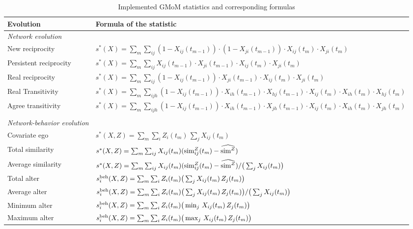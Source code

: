 \documentclass[a4paper,11pt]{article}
\begin{document}
\begin{table}%
\footnotesize
\begin{tabular}{ll}
\hline
Evolution & Formula of the statistic\\
\hline
\emph{Network evolution} & \\[2ex]
New reciprocity & $s^{*}(X)=\sum_{m}\sum_{ij}(1-X_{ij}(t_{m-1}))\cdot (1-X_{ji}(t_{m-1}))\cdot X_{ij}(t_{m})\cdot X_{ji}(t_{m})$\\[5ex]
Persistent reciprocity & $s^{*}(X)=\sum_{m}\sum_{ij}X_{ij}(t_{m-1})\cdot X_{ji}(t_{m-1})\cdot X_{ij}(t_{m})\cdot X_{ji}(t_{m})$\\[5ex]
Real reciprocity & $s^{*}(X)=\sum_{m}\sum_{ij}(1-X_{ij}(t_{m-1}))\cdot X_{ji}(t_{m-1})\cdot X_{ij}(t_{m})\cdot X_{ji}(t_{m}) $\\[5ex]
Real Transitivity & $s^{*}(X)=\sum_{m}\sum_{ijh}(1-X_{ij}(t_{m-1}))\cdot X_{ih}(t_{m-1})\cdot X_{hj}(t_{m-1})\cdot X_{ij}(t_{m})\cdot X_{ih}(t_{m})\cdot X_{hj}(t_{m})$\\[5ex]
Agree transitivity & $s^{*}(X)=\sum_{m}\sum_{ijh}(1-X_{ij}(t_{m-1}))\cdot X_{ih}(t_{m-1})\cdot X_{jh}(t_{m-1})\cdot X_{ij}(t_{m})\cdot X_{ih}(t_{m})\cdot X_{jh}(t_{m})$\\[2ex]
\hline\\
\emph{Network-behavior evolution} & \\[2ex]
Covariate ego &  $s^{*}(X,Z) = \sum_{m}\sum_i Z_i(t_m) \, \sum_j X_{ij}(t_m) $\\[5ex]
Total similarity & $s^{*}(X,Z) = \sum_{m}\sum_{ij} X_{ij}(t_m) ({\rm sim}^Z_{ij}(t_m) - \widehat{{\rm sim}^Z}) $\\[5ex]
Average similarity & $s^{*}(X,Z) = \sum_{m}\sum_{ij} X_{ij}(t_m) ({\rm sim}^Z_{ij}(t_m) - \widehat{{\rm sim}^Z})/ \big (\sum_j X_{ij}(t_m)\big) $\\[5ex]
Total alter &  $s^{\rm beh}_{i}(X, Z) = \sum_{m}\sum_i Z_i(t_m) \big( \sum_j X_{ij}(t_m)\, Z_j(t_m) \big) $\\[5ex]
Average alter & $s^{\rm beh}_{i}(X, Z) = \sum_{m}\sum_i Z_i(t_m) \big( \sum_j X_{ij}(t_m)\, Z_j(t_m) \big)/ \big (\sum_j X_{ij}(t_m)\big)  $\\[5ex]
Minimum alter & $s^{\rm beh}_{i}(X, Z) = \sum_{m}\sum_i Z_i(t_m) \big( \min_j \, X_{ij}(t_m)\, Z_j(t_m) \big) $\\[5ex]
Maximum alter & $s^{\rm beh}_{i}(X, Z) = \sum_{m}\sum_i Z_i(t_m) \big( \max_j \, X_{ij}(t_m)\, Z_j(t_m) \big) $\\[5ex]
\hline
\end{tabular}
\caption{Implemented GMoM statistics and corresponding formulas}
\label{tab:one}
\end{table}
\end{document}
